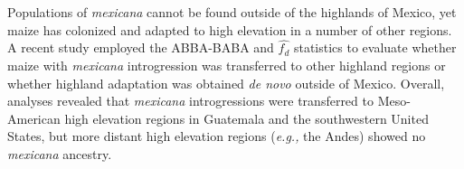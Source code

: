 \documentclass[11pt]{article}
\begin{document}
\begin{enumerate}

Populations of \emph{mexicana} cannot be found outside of the highlands of Mexico, yet maize has colonized and adapted to high elevation in a number of other regions.
A recent study \cite{wang2017} employed the ABBA-BABA and $\hat{f_{d}}$ statistics to evaluate whether maize with \emph{mexicana} introgression was transferred to other highland regions or whether highland adaptation was obtained \emph{de novo} outside of Mexico.
Overall, analyses revealed that  \emph{mexicana} introgressions were transferred to Meso-American high elevation regions in Guatemala and the southwestern United States, but more distant high elevation regions (\emph{e.g.,} the Andes) showed no \emph{mexicana} ancestry. 


\end{enumerate}
\end{document}
